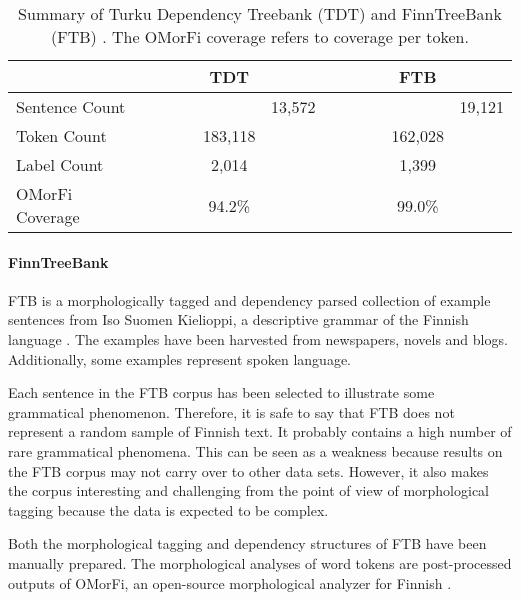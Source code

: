 \begin{table}[htb!]
\begin{center}
\begin{tabular}{l|c|c} 
\hline
 & TDT & FTB \\
\hline
\parbox{0.25\textwidth}{Sentence Count} & \parbox[c]{0.25\textwidth}{~~~~~~~~~~~~~~~~13,572} & \parbox[c]{0.25\textwidth}{~~~~~~~~~~~~~~~~19,121} \\
Token Count    &  183,118 & 162,028 \\
Label Count & 2,014 & 1,399 \\
OMorFi Coverage & 94.2\% & 99.0\% \\
\end{tabular}
\end{center}
\caption{Summary of Turku Dependency Treebank (TDT) \citep{Haverinen2013} and FinnTreeBank (FTB) \citep{Voutilainen2011}. The OMorFi coverage refers to coverage per token.}
\label{tab:data} 
\end{table}

\paragraph{FinnTreeBank}
FTB is a morphologically tagged and dependency parsed collection of
example sentences from Iso Suomen Kielioppi, a descriptive grammar of
the Finnish language \citep{Hakulinen2004}. The examples have been
harvested from newspapers, novels and blogs. Additionally, some
examples represent spoken language. 

Each sentence in the FTB corpus has been selected to illustrate some
grammatical phenomenon. Therefore, it is safe to say that FTB does not
represent a random sample of Finnish text. It probably contains a high
number of rare grammatical phenomena. This can be seen as a weakness
because results on the FTB corpus may not carry over to other data
sets. However, it also makes the corpus interesting and challenging
from the point of view of morphological tagging because the data is
expected to be complex.

Both the morphological tagging and dependency structures of FTB have
been manually prepared.  The morphological analyses of word tokens are
post-processed outputs of OMorFi, an open-source morphological
analyzer for Finnish
\citep{Pirinen2011}. %

